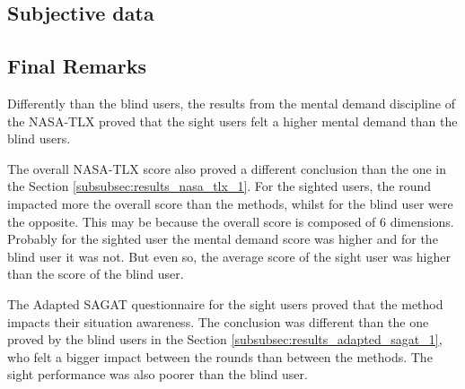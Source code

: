 %
\subsection{Subjective data}




 

\subsection{Final Remarks}


% 
%




Differently than the blind users, the results from the mental demand discipline of the NASA-TLX proved that the sight users felt a higher mental demand than the blind users. 

The overall NASA-TLX score also proved a different conclusion than the one in the Section \ref{subsubsec:results_nasa_tlx_1}. For the sighted users, the round impacted more the overall score than the methods, whilst for the blind user were the opposite. This may be because the overall score is composed of 6 dimensions. Probably for the sighted user the mental demand score was higher and for the blind user it was not. But even so, the average score of the sight user was higher than the score of the blind user.

The Adapted SAGAT questionnaire for the sight users proved that the method impacts their situation awareness. The conclusion was different than the one proved by the blind users in the Section \ref{subsubsec:results_adapted_sagat_1}, who felt a bigger impact between the rounds than between the methods. The sight performance was also poorer than the blind user.


